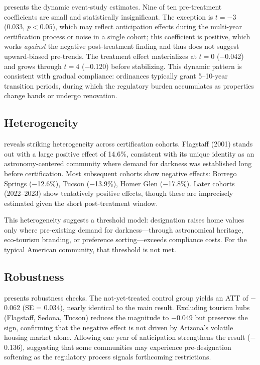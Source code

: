 \documentclass[12pt]{article}
\begin{document}


 presents the dynamic event-study estimates. Nine of ten pre-treatment coefficients are small and statistically insignificant. The exception is $t = -3$ (0.033, $p < 0.05$), which may reflect anticipation effects during the multi-year certification process or noise in a single cohort; this coefficient is positive, which works \textit{against} the negative post-treatment finding and thus does not suggest upward-biased pre-trends. The treatment effect materializes at $t = 0$ ($-$0.042) and grows through $t = 4$ ($-$0.120) before stabilizing. This dynamic pattern is consistent with gradual compliance: ordinances typically grant 5--10-year transition periods, during which the regulatory burden accumulates as properties change hands or undergo renovation.

\subsection{Heterogeneity}



 reveals striking heterogeneity across certification cohorts. Flagstaff (2001) stands out with a large positive effect of 14.6\%, consistent with its unique identity as an astronomy-centered community where demand for darkness was established long before certification. Most subsequent cohorts show negative effects: Borrego Springs ($-$12.6\%), Tucson ($-$13.9\%), Homer Glen ($-$17.8\%). Later cohorts (2022--2023) show tentatively positive effects, though these are imprecisely estimated given the short post-treatment window.

This heterogeneity suggests a threshold model: designation raises home values only where pre-existing demand for darkness---through astronomical heritage, eco-tourism branding, or preference sorting---exceeds compliance costs. For the typical American community, that threshold is not met.

\subsection{Robustness}



 presents robustness checks. The not-yet-treated control group yields an ATT of $-$0.062 (SE = 0.034), nearly identical to the main result. Excluding tourism hubs (Flagstaff, Sedona, Tucson) reduces the magnitude to $-$0.049 but preserves the sign, confirming that the negative effect is not driven by Arizona's volatile housing market alone. Allowing one year of anticipation strengthens the result ($-$0.136), suggesting that some communities may experience pre-designation softening as the regulatory process signals forthcoming restrictions.
\end{document}
